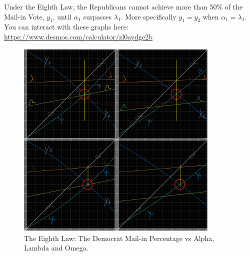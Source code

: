 \documentclass[preprint,13pt]{elsarticle}
\begin{document}
Under the Eighth Law, the Republicans cannot achieve more than 50\% of the Mail-in Vote, $y_{1}$, until $\alpha_{1}$ surpasses $\lambda_{1}$. More specifically $y_{1}=y_{2}$ when $\alpha_{1}=\lambda_{1}$. You can interact with these graphs here: \url{https://www.desmos.com/calculator/zl0aydge2b}
\begin{figure}[bp!]
\begin{center}
\caption{The Eighth Law: The Democrat Mail-in Percentage vs Alpha, Lambda and Omega.}
\includegraphics[width=275pt]{Fourth and Eigth Law.png}
\end{center}
\end{figure}
\newpage
\end{document}
